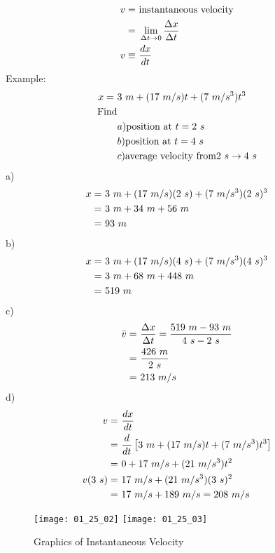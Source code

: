 	\begin{align}
		v = \ &\text{instantaneous velocity}& \notag \\
		= \ &\lim_{\Delta t \to 0} \frac{\Delta x}{\Delta t}& \notag \\
		v \equiv \ &\frac{dx}{dt}& \notag
	\end{align}
	Example:
	\begin{align}
		x = \ &3 \ m + (17 \ m/s)t + (7 \ m/s^{3})t^{3}& \notag \\
		\text{Find} && \notag \\
		&a) \text{position at } t = 2 \ s& \notag \\
		&b) \text{position at } t = 4 \ s& \notag \\
		&c) \text{average velocity from} 2 \ s \to 4 \ s& \notag
	\end{align}
	a)
	\begin{align}
		x = \ &3 \ m + (17 \ m/s)(2 \ s) + (7 \ m/s^{3})(2 \ s)^{3}& \notag \\
		= \ &3 \ m + 34 \ m + 56 \ m& \notag \\
		= \ &93 \ m& \notag \\
	\end{align}
	b)
	\begin{align}
		x = \ &3 \ m + (17 \ m/s)(4 \ s) + (7 \ m/s^{3})(4 \ s)^{3}& \notag \\
		= \ &3 \ m + 68 \ m + 448 \ m& \notag \\
		= \ &519 \ m& \notag
	\end{align}
	c)
	\begin{align}
		\bar{v} = \ &\frac{\Delta x}{\Delta t} = \frac{519 \ m - 93 \ m}{4 \ s - 2 \ s}& \notag \\
		= \ &\frac{426 \ m}{2 \ s}& \notag \\
		= \ &213 \ m/s& \notag
	\end{align}
	d)
	\begin{align}
		v = \ &\frac{dx}{dt}& \notag \\
		= \ &\frac{d}{dt}\left[ 3 \ m + (17 \ m/s)t + (7 \ m/s^{3})t^{3} \right] \notag \\
		= \ &0 + 17 \ m/s + (21 \ m/s^{3})t^{2}& \notag \\
		v(3 \ s) = \ &17 \ m/s + (21 \ m/s^{3})(3 \ s)^{2}& \notag \\
		= \ &17 \ m/s + 189 \ m/s = 208 \ m/s& \notag
	\end{align}

	\begin{figure}[H]
		\begin{center}
			\texttt{[image: 01\_25\_02]}
			\texttt{[image: 01\_25\_03]}
			\caption{Graphics of Instantaneous Velocity}
			\label{fig:01_25_02-03}
		\end{center}
	\end{figure}
